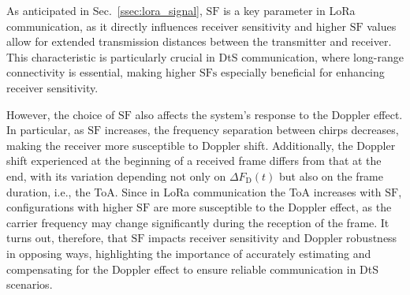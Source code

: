 \documentclass{IEEEtran}
\begin{document}


As anticipated in Sec.~\ref{ssec:lora_signal}, $\mathrm{SF}$ is a key parameter in \ac{LoRa} communication, as it directly influences receiver sensitivity and higher $\mathrm{SF}$ values allow for extended transmission distances between the transmitter and receiver. This characteristic is particularly crucial in \ac{DtS} communication, where long-range connectivity is essential, making higher $\textrm{SFs}$ especially beneficial for enhancing receiver sensitivity.

However, the choice of $\mathrm{SF}$ also affects the system's response to the Doppler effect. In particular, as $\mathrm{SF}$ increases, the frequency separation between chirps decreases, making the receiver more susceptible to Doppler shift. Additionally, the Doppler shift experienced at the beginning of a received frame differs from that at the end, with its variation depending not only on $\Delta F_{\mathrm{D}}(t)$ but also on the frame duration, i.e., the \ac{ToA}. Since in \ac{LoRa} communication the \ac{ToA} increases with $\mathrm{SF}$, configurations with higher $\mathrm{SF}$ are more susceptible to the Doppler effect, as the carrier frequency may change significantly during the reception of the frame. It turns out, therefore, that $\textrm{SF}$ impacts receiver sensitivity and Doppler robustness in opposing ways, highlighting the importance of accurately estimating and compensating for the Doppler effect to ensure reliable communication in \ac{DtS} scenarios.
\end{document}

